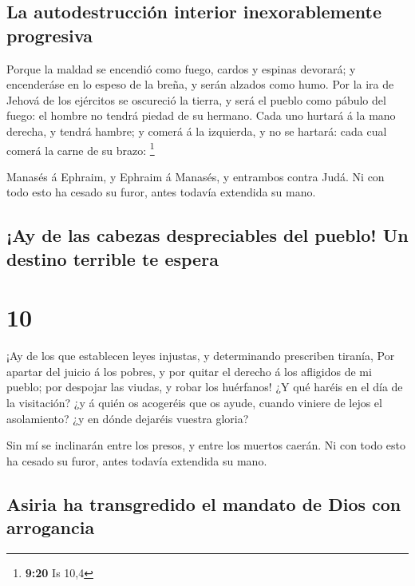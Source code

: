 \hypertarget{la-autodestrucciuxf3n-interior-inexorablemente-progresiva}{%
\subsection{La autodestrucción interior inexorablemente
progresiva}\label{la-autodestrucciuxf3n-interior-inexorablemente-progresiva}}

 Porque la maldad se encendió como fuego, cardos y espinas
devorará; y encenderáse en lo espeso de la breña, y serán alzados como
humo.  Por la ira de Jehová de los ejércitos se oscureció
la tierra, y será el pueblo como pábulo del fuego: el hombre no tendrá
piedad de su hermano.  Cada uno hurtará á la mano derecha,
y tendrá hambre; y comerá á la izquierda, y no se hartará: cada cual
comerá la carne de su brazo: \footnote{\textbf{9:20} Is 10,4}

 Manasés á Ephraim, y Ephraim á Manasés, y entrambos contra
Judá. Ni con todo esto ha cesado su furor, antes todavía extendida su
mano.

\hypertarget{ay-de-las-cabezas-despreciables-del-pueblo-un-destino-terrible-te-espera}{%
\subsection{¡Ay de las cabezas despreciables del pueblo! Un destino
terrible te
espera}\label{ay-de-las-cabezas-despreciables-del-pueblo-un-destino-terrible-te-espera}}

\hypertarget{section-9}{%
\section{10}\label{section-9}}

 ¡Ay de los que establecen leyes injustas, y determinando
prescriben tiranía,  Por apartar del juicio á los pobres, y
por quitar el derecho á los afligidos de mi pueblo; por despojar las
viudas, y robar los huérfanos!  ¿Y qué haréis en el día de
la visitación? ¿y á quién os acogeréis que os ayude, cuando viniere de
lejos el asolamiento? ¿y en dónde dejaréis vuestra gloria?

 Sin mí se inclinarán entre los presos, y entre los muertos
caerán. Ni con todo esto ha cesado su furor, antes todavía extendida su
mano.

\hypertarget{asiria-ha-transgredido-el-mandato-de-dios-con-arrogancia}{%
\subsection{Asiria ha transgredido el mandato de Dios con
arrogancia}\label{asiria-ha-transgredido-el-mandato-de-dios-con-arrogancia}}

